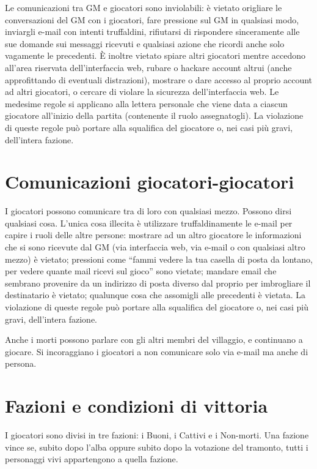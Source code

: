 \documentclass[a4paper,10pt]{article}
\begin{document}
Le comunicazioni tra GM e giocatori sono inviolabili: è vietato origliare le conversazioni del GM con i giocatori, fare pressione sul GM in qualsiasi modo, inviargli e-mail con intenti truffaldini, rifiutarsi di rispondere sinceramente alle sue domande sui messaggi ricevuti e qualsiasi azione che ricordi anche solo vagamente le precedenti.
È inoltre vietato spiare altri giocatori mentre accedono all'area riservata dell'interfaccia web, rubare o hackare account altrui (anche approfittando di eventuali distrazioni), mostrare o dare accesso al proprio account ad altri giocatori, o cercare di violare la sicurezza dell'interfaccia web.
Le medesime regole si applicano alla lettera personale che viene data a ciascun giocatore all'inizio della partita (contenente il ruolo assegnatogli).
La violazione di queste regole può portare alla squalifica del giocatore o, nei casi più gravi, dell'intera fazione.


\section{Comunicazioni giocatori-giocatori}

I giocatori possono comunicare tra di loro con qualsiasi mezzo. Possono dirsi qualsiasi cosa.
L’unica cosa illecita è utilizzare truffaldinamente le e-mail per capire i ruoli delle altre persone: mostrare ad un altro giocatore le informazioni che si sono ricevute dal GM (via interfaccia web, via e-mail o con qualsiasi altro mezzo) è vietato; pressioni come ``fammi vedere la tua casella di posta da lontano, per vedere quante mail ricevi sul gioco'' sono vietate; mandare email che sembrano provenire da un indirizzo di posta diverso dal proprio per imbrogliare il destinatario è vietato; qualunque cosa che assomigli alle precedenti è vietata. La violazione di queste regole può portare alla squalifica del giocatore o, nei casi più gravi, dell'intera fazione.

Anche i morti possono parlare con gli altri membri del villaggio, e continuano a giocare. Si incoraggiano i giocatori a non comunicare solo via e-mail ma anche di persona.



\section{Fazioni e condizioni di vittoria}

I giocatori sono divisi in tre fazioni: i Buoni, i Cattivi e i Non-morti.
Una fazione vince se, subito dopo l'alba oppure subito dopo la votazione del tramonto, tutti i personaggi vivi appartengono a quella fazione.
\end{document}
